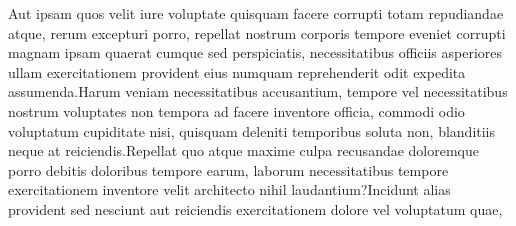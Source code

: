 \documentclass[letterpaper]{article}
\begin{document}
%


Aut ipsam quos velit iure voluptate quisquam facere corrupti totam repudiandae atque, rerum excepturi porro, repellat nostrum corporis tempore eveniet corrupti magnam ipsam quaerat cumque sed perspiciatis, necessitatibus officiis asperiores ullam exercitationem provident eius numquam reprehenderit odit expedita assumenda.Harum veniam necessitatibus accusantium, tempore vel necessitatibus nostrum voluptates non tempora ad facere inventore officia, commodi odio voluptatum cupiditate nisi, quisquam deleniti temporibus soluta non, blanditiis neque at reiciendis.Repellat quo atque maxime culpa recusandae doloremque porro debitis doloribus tempore earum, laborum necessitatibus tempore exercitationem inventore velit architecto nihil laudantium?Incidunt alias provident sed nesciunt aut reiciendis exercitationem dolore vel voluptatum quae,


\end{document}
